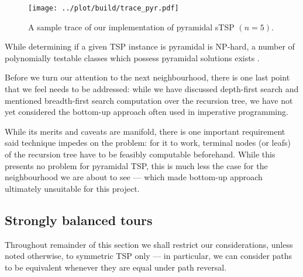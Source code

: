 \documentclass[index=totoc,bibliography=totoc]{scrartcl}
\numberwithin{equation}{section}
\numberwithin{figure}{section}
\numberwithin{table}{section}
\begin{document}
\begin{figure}[hbt]
\centering
\texttt{[image: ../plot/build/trace\_pyr.pdf]}
\caption{A sample trace of our implementation of pyramidal sTSP $(n = 5)$.}
\label{fig:pyrstrace}
\end{figure}

\begin{remark}
While determining if a given TSP instance is pyramidal is NP-hard,
a number of polynomially testable classes which possess
pyramidal solutions exists \cite{baki}.
\end{remark}

Before we turn our attention to the next neighbourhood, there is one last
point that we feel needs to be addressed: while we have discussed
depth-first search and mentioned breadth-first search computation over the
recursion tree, we have not yet considered the bottom-up approach often
used in imperative programming.

While its merits and caveats
are manifold, there is one important requirement said technique impedes on the
problem: for it to work, terminal nodes (or leafs) of the recursion tree
have to be feasibly computable beforehand.  While this presents no problem
for pyramidal TSP, this is much less the case for the neighbourhood we are
about to see --- which made bottom-up approach ultimately unsuitable for
this project.

\subsection{Strongly balanced tours}

Throughout remainder of this section we shall restrict our considerations,
unless noted otherwise, to symmetric TSP only --- in particular, we can
consider paths to be equivalent whenever they are equal under path
reversal. %
\end{document}
